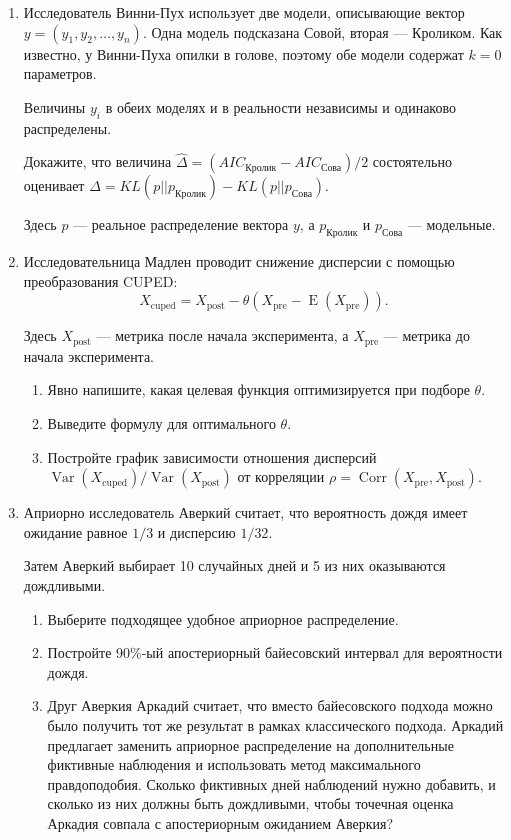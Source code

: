 \documentclass[12pt]{article}
\DeclareMathOperator{\Corr}{Corr}
\DeclareMathOperator{\Var}{Var}
\DeclareMathOperator{\E}{E}
\begin{document}
\begin{enumerate}
	
	
	\item Исследователь Винни-Пух использует две модели, описывающие вектор $y=(y_1, y_2, \ldots, y_n)$. 
	Одна модель подсказана Совой, вторая — Кроликом. 
	Как известно, у Винни-Пуха опилки в голове, поэтому обе модели содержат $k=0$ параметров.

	Величины $y_i$ в обеих моделях и в реальности независимы и одинаково распределены.

	Докажите, что величина $\hat \Delta = (AIC_{\text{Кролик}} - AIC_{\text{Сова}})/2$ состоятельно оценивает $\Delta = KL(p||p_{\text{Кролик}}) - KL(p||p_{\text{Сова}})$.
	
	Здесь $p$ — реальное распределение вектора $y$, а $p_{\text{Кролик}}$ и $p_{\text{Сова}}$ — модельные.

\newpage
\item Исследовательница Мадлен проводит снижение дисперсии с помощью преобразования CUPED:
\[
X_{\text{cuped}} = 	X_{\text{post}} - \theta (X_{\text{pre}} - \E(X_{\text{pre}})).
\]

Здесь $X_{\text{post}}$ — метрика после начала эксперимента, а $X_{\text{pre}}$ — метрика до начала эксперимента.

\begin{enumerate}
	\item Явно напишите, какая целевая функция оптимизируется при подборе $\theta$.
	\item Выведите формулу для оптимального $\theta$. 
	\item Постройте график зависимости отношения дисперсий $\Var(X_{\text{cuped}})/\Var(X_{\text{post}})$ от корреляции $\rho = \Corr(X_{\text{pre}}, X_{\text{post}})$.
\end{enumerate}


\item Априорно исследователь Аверкий считает, что вероятность дождя имеет ожидание равное $1/3$ и дисперсию $1/32$. 

Затем Аверкий выбирает 10 случайных дней и 5 из них оказываются дождливыми.

\begin{enumerate}
	\item Выберите подходящее удобное априорное распределение.
	\item Постройте 90\%-ый апостериорный байесовский интервал для вероятности дождя.
	\item Друг Аверкия Аркадий считает, что вместо байесовского подхода можно было получить тот же результат в рамках классического подхода. 
	Аркадий предлагает заменить априорное распределение на дополнительные фиктивные наблюдения и использовать метод максимального правдоподобия.
	Сколько фиктивных дней наблюдений нужно добавить, и сколько из них должны быть дождливыми, чтобы точечная оценка Аркадия 
	совпала с апостериорным ожиданием Аверкия?
\end{enumerate}



\end{enumerate}
\end{document}
